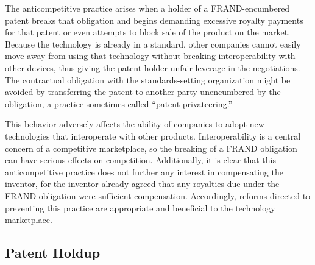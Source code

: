 \documentclass[11pt,twocolumn,titlepage]{article}
\begin{document}
The anticompetitive practice arises when a holder of a FRAND-encumbered patent
breaks that obligation and begins demanding excessive royalty payments for that
patent or even attempts to block sale of the product on the market.
Because the technology is already in a standard, other companies cannot
easily move away from using that technology without breaking interoperability
with other devices, thus giving the patent holder unfair leverage in the
negotiations. The contractual obligation with the standards-setting
organization might be avoided by transferring the patent to another party
unencumbered by the obligation, a practice sometimes called ``patent
privateering.''

This behavior adversely affects the ability of companies to adopt new
technologies that interoperate with other products. Interoperability is a
central concern of a competitive marketplace, so the breaking of a FRAND
obligation can have serious effects on competition. Additionally, it is clear
that this anticompetitive practice does not further any interest in
compensating the inventor, for the inventor already agreed that any royalties
due under the FRAND obligation were sufficient compensation. Accordingly,
reforms directed to preventing this practice are appropriate and beneficial to
the technology marketplace.

\subsection{Patent Holdup}
\SectionNote
\end{document}
